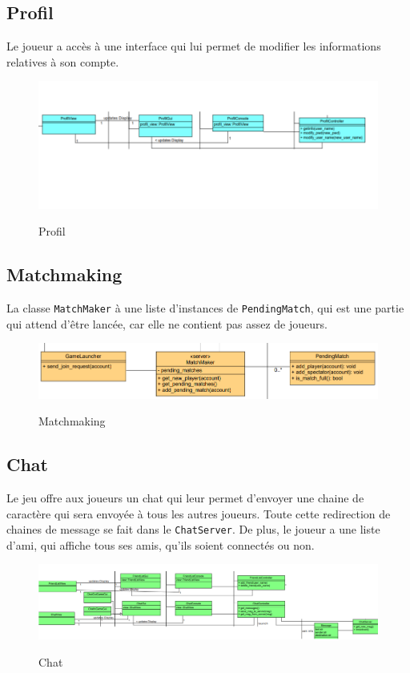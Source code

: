 \documentclass[../design_fonctionnement_sys.tex]{subfiles}
\begin{document}
\subsection{Profil}
Le joueur a accès à une interface qui lui permet de modifier les informations relatives à son compte.
\begin{figure}[H]
    \centering
    \includegraphics[scale=0.6]{img_design/Profil.png}
    \label{fig:seq_match_server}
    \caption{Profil}
\end{figure}

\subsection{Matchmaking}
La classe \texttt{MatchMaker} à une liste d'instances de \texttt{PendingMatch}, 
qui est une partie qui attend d'être lancée, car elle ne contient pas assez de joueurs.
\begin{figure}[H]
    \centering
    \includegraphics[scale=0.6]{img_design/Matchmaking.png}
    \label{fig:seq_match_server}
    \caption{Matchmaking}
\end{figure}

\subsection{Chat}
Le jeu offre aux joueurs un chat qui leur permet d'envoyer une chaine de caractère qui sera envoyée à tous les autres joueurs. 
Toute cette redirection de chaines de message se fait dans le \texttt{ChatServer}.
De plus, le joueur a une liste d'ami, qui affiche tous ses amis, qu'ils soient connectés ou non.
\begin{figure}[H]
    \centering
    \includegraphics[scale=0.6]{img_design/Chat.png}
    \label{fig:seq_match_server}
    \caption{Chat}
\end{figure}
\end{document}
